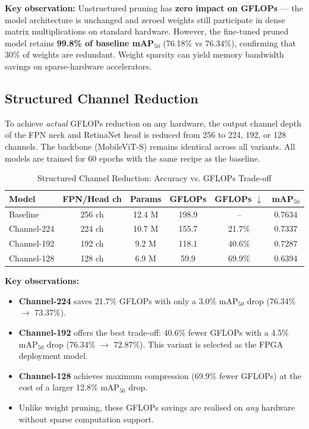 \textbf{Key observation:} Unstructured pruning has \textbf{zero impact on GFLOPs} --- the model architecture is unchanged and zeroed weights still participate in dense matrix multiplications on standard hardware. However, the fine-tuned pruned model retains \textbf{99.8\% of baseline mAP$_{50}$} (76.18\% vs 76.34\%), confirming that 30\% of weights are redundant. Weight sparsity can yield memory bandwidth savings on sparse-hardware accelerators.

\subsection{Structured Channel Reduction}

To achieve \textit{actual} GFLOPs reduction on any hardware, the output channel depth of the FPN neck and RetinaNet head is reduced from 256 to 224, 192, or 128 channels. The backbone (MobileViT-S) remains identical across all variants. All models are trained for 60 epochs with the same recipe as the baseline.

\begin{table}[H]
\centering
\caption{Structured Channel Reduction: Accuracy vs. GFLOPs Trade-off}
\begin{tabular}{|l|c|c|c|c|c|}
\hline
\textbf{Model} & \textbf{FPN/Head ch} & \textbf{Params} & \textbf{GFLOPs} & \textbf{GFLOPs $\downarrow$} & \textbf{mAP$_{50}$} \\
\hline
Baseline             & 256 ch & 12.4 M & 198.9 & --     & 0.7634 \\
Channel-224          & 224 ch & 10.7 M & 155.7 & 21.7\% & 0.7337 \\
Channel-192          & 192 ch &  9.2 M & 118.1 & 40.6\% & 0.7287 \\
Channel-128          & 128 ch &  6.9 M &  59.9 & 69.9\% & 0.6394 \\
\hline
\end{tabular}
\label{table:channel_reduction}
\end{table}

\textbf{Key observations:}
\begin{itemize}
    \item \textbf{Channel-224} saves 21.7\% GFLOPs with only a 3.0\% mAP$_{50}$ drop (76.34\% $\rightarrow$ 73.37\%).
    \item \textbf{Channel-192} offers the best trade-off: 40.6\% fewer GFLOPs with a 4.5\% mAP$_{50}$ drop (76.34\% $\rightarrow$ 72.87\%). This variant is selected as the FPGA deployment model.
    \item \textbf{Channel-128} achieves maximum compression (69.9\% fewer GFLOPs) at the cost of a larger 12.8\% mAP$_{50}$ drop.
    \item Unlike weight pruning, these GFLOPs savings are realised on \textit{any} hardware without sparse computation support.
\end{itemize}

